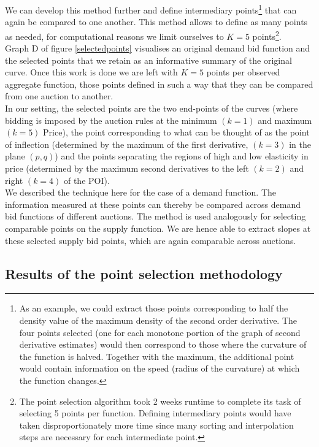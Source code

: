 We can develop this method further and define intermediary points\footnote{As an example, we could extract those points corresponding to half the density value of the maximum density of the second order derivative. The four points selected (one for each monotone portion of the graph of second derivative estimates) would then correspond to those where the curvature of the function is halved. Together with the maximum, the additional point would contain information on the speed (radius of the curvature) at which the function changes.} that can again be compared to one another. This method allows to define as many points as needed, for computational reasons we limit ourselves to $K=5$ points\footnote{The point selection algorithm took 2 weeks runtime to complete its task of selecting 5 points per function. Defining intermediary points would have taken disproportionately more time since many sorting and interpolation steps are necessary for each intermediate point.}. \\

Graph D of figure \ref{selectedpoints} visualises an original demand bid function and the selected points that we retain as an informative summary of the original curve. Once this work is done we are left with $K=5$ points per observed aggregate function, those points defined in such a way that they can be compared from one auction to another. \\

In our setting, the selected points are the two end-points of the curves (where bidding is imposed by the auction rules at the minimum $(k=1)$ and maximum $(k=5)$ Price), the point corresponding to what can be thought of as the point of inflection (determined by the maximum of the first derivative, $(k=3)$ in the plane $(p,q)$) and the points separating the regions of high and low elasticity in price (determined by the maximum second derivatives to the left $(k=2)$ and right $(k=4)$ of the POI). \\

We described the technique here for the case of a demand function. The information measured at these points can thereby be compared across demand bid functions of different auctions. The method is used analogously for selecting comparable points on the supply function. We are hence able to extract slopes at these selected supply bid points, which are again comparable across auctions.\\


\subsection{Results of the point selection methodology}
\label{pointresults}

